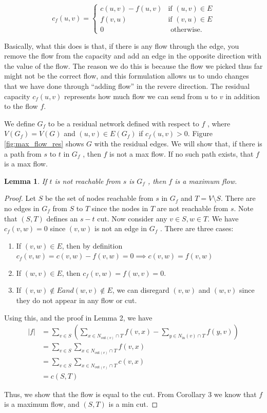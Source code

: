\documentclass [12pt]{article}
\newtheorem{lemma}[theorem]{Lemma}
\theoremstyle{definition}
\begin{document}
$$
c_f (u, v ) = \begin{cases}
    c(u, v ) - f (u, v ) & \text{if }(u, v ) \in E \\
    f (v, u) & \text{if }(v, u) \in E \\
    0 & \text{ otherwise. }
\end{cases}
$$

Basically, what this does is that, if there is any flow through the edge, you remove the flow from the capacity and add an edge in the opposite direction with the value of the flow. The reason we do this is because the flow we picked thus far might not be the correct flow, and this formulation allows us to undo changes that we have done through ``adding flow'' in the revere direction. The residual capacity $c_f (u, v )$ represents how much flow we can send from $u$ to $v$ in addition to the flow $f$. 

We define $G_f$ to be a residual network defined with respect to $f$ , where $V (G_f ) = V (G)$ and $(u, v ) \in E(G_f )$ if $c_f (u, v ) > 0$. Figure \ref{fig:max_flow_res} shows $G$ with the residual edges. We will show that, if there is a path from $s$ to $t$ in $G_f$ , then $f$ is not a max flow. If no such path exists, that $f$ is a max flow.


\begin{lemma}
If $t$ is not reachable from $s$ is $G_f$ , then $f$ is a maximum flow.
\end{lemma}
\begin{proof} 
Let $S$ be the set of nodes reachable from $s$ in $G_f$ and $T = V \setminus S$. There are no edges in $G_f$ from $S$ to $T$ since the nodes in $T$ are not reachable from $s$. Note that $(S, T)$ defines an $s-t$ cut. Now consider any $v \in S, w \in T$. We have $c_f (v, w) = 0$ since $(v, w)$ is not an edge in $G_f$ . There are three cases: 
\begin{enumerate}
    \item If $(v, w) \in E$, then by definition $c_f (v, w) = c(v, w) - f (v, w) = 0 \implies c(v, w) = f (v, w)$\item If $(w, v ) \in E$, then $c_f (v, w) = f (w, v ) = 0$.
    \item If $(v, w) \notin E and (w, v ) \notin E$, we can disregard $(v, w)$ and $(w, v )$ since they do not appear in any flow or cut.
\end{enumerate}

 Using this, and the proof in Lemma 2, we have 
 \begin{align*}
 |f | &= \sum_{v\in S} \left( \sum_{x\in N_{\text{out}(v)} \cap T} f (v, x) - \sum_{y\in N_{\text{in}}(v) \cap T} f (y, v ) \right) \\
 &= \sum_{v\in S} \sum_{x\in N_{\text{out}(v)} \cap T} f (v, x) \tag{from case 2 the second term is 0} \\
 &= \sum_{v\in S} \sum_{x\in N_{\text{out}(v)} \cap T} c(v, x) \tag{from case 1}\\
 &= c(S, T)
 \end{align*}

 Thus, we show that the flow is equal to the cut. From Corollary 3 we know that $f$ is a maximum flow, and $(S, T)$ is a min cut.
\end{proof}
\end{document}
